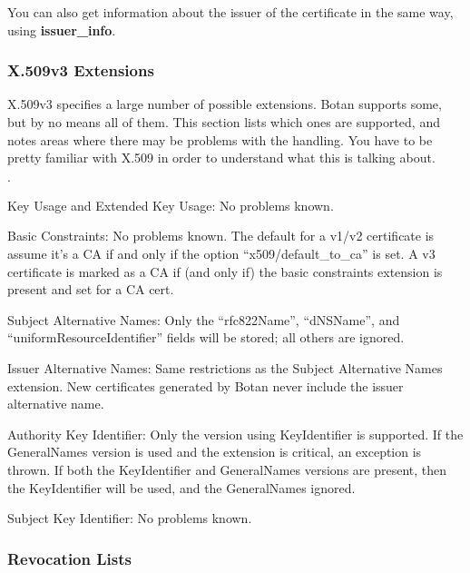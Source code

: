 \documentclass{article}
\newcommand{\function}[1]{\textbf{#1}}
\begin{document}
You can also get information about the issuer of the certificate in the same
way, using \function{issuer\_info}.

\subsubsection{X.509v3 Extensions}

X.509v3 specifies a large number of possible extensions. Botan supports some,
but by no means all of them. This section lists which ones are supported, and
notes areas where there may be problems with the handling. You have to be
pretty familiar with X.509 in order to understand what this is talking about.

\begin{list}{$\cdot$}
  \item Key Usage and Extended Key Usage: No problems known.
  \item

  \item Basic Constraints: No problems known. The default for a v1/v2
        certificate is assume it's a CA if and only if the option
        ``x509/default\_to\_ca'' is set. A v3 certificate is marked as a CA if
        (and only if) the basic constraints extension is present and set for a
        CA cert.

  \item Subject Alternative Names: Only the ``rfc822Name'', ``dNSName'', and
        ``uniformResourceIdentifier'' fields will be stored; all others are
        ignored.

  \item Issuer Alternative Names: Same restrictions as the Subject Alternative
        Names extension. New certificates generated by Botan never include the
        issuer alternative name.

  \item Authority Key Identifier: Only the version using KeyIdentifier is
        supported. If the GeneralNames version is used and the extension is
        critical, an exception is thrown. If both the KeyIdentifier and
        GeneralNames versions are present, then the KeyIdentifier will be
        used, and the GeneralNames ignored.

  \item Subject Key Identifier: No problems known.
\end{list}

\subsubsection{Revocation Lists}
\end{document}
